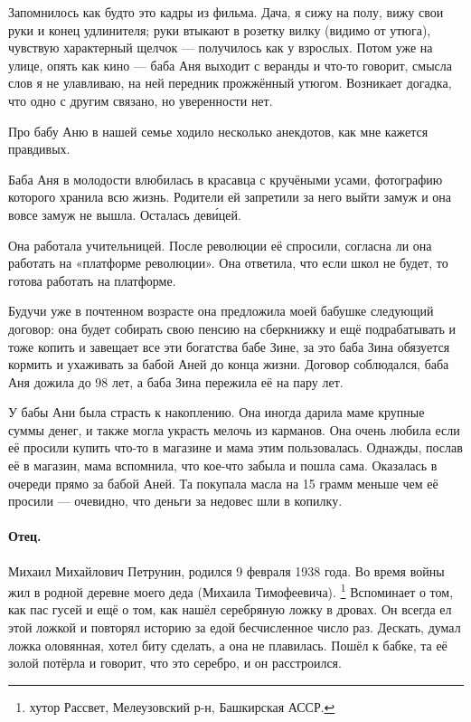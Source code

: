 \documentclass{book}
\begin{document}
Запомнилось как будто это кадры из фильма.
Дача, я сижу на полу, вижу свои руки и конец удлинителя;
руки втыкают в розетку вилку (видимо от утюга), чувствую характерный щелчок --- получилось как у взрослых.
Потом уже на улице, опять как кино --- баба Аня выходит с веранды и что-то говорит, смысла слов я не улавливаю, на ней передник прожжённый утюгом.
Возникает догадка, что одно с другим связано, но уверенности нет.

Про бабу Аню в нашей семье ходило несколько анекдотов, как мне кажется правдивых.

Баба Аня в молодости влюбилась в красавца с кручёными усами, фотографию которого хранила всю жизнь.
Родители ей запретили за него выйти замуж и она вовсе замуж не вышла.
Осталась дев\'{и}цей.

Она работала учительницей.
После революции её спросили, согласна ли она работать на «платформе революции».
Она ответила, что если школ не будет, то готова работать на платформе.

Будучи уже в почтенном возрасте она предложила моей бабушке следующий договор: она будет собирать свою пенсию на сберкнижку и ещё подрабатывать и тоже копить и завещает все эти богатства бабе Зине, за это баба Зина обязуется кормить и ухаживать за бабой Аней до конца жизни.
Договор соблюдался, баба Аня дожила до 98 лет, а баба Зина пережила её на пару лет.

У бабы Ани была страсть к накоплению.
Она иногда дарила маме крупные суммы денег, и также могла украсть мелочь из карманов.
Она очень любила если её просили купить что-то в магазине и мама этим пользовалась.
Однажды, послав её в магазин, мама вспомнила, что кое-что забыла и пошла сама.
Оказалась в очереди прямо за бабой Аней.
Та покупала масла на 15 грамм меньше чем её просили — очевидно, что деньги за недовес шли в копилку.

\paragraph{Отец.}  Михаил Михайлович Петрунин, родился 9 февраля 1938 года.
Во время войны жил в родной деревне моего деда (Михаила Тимофеевича).%
\footnote{хутор Рассвет, Мелеузовский р-н, Башкирская АССР.}
Вспоминает о том, как пас гусей и ещё о том, как нашёл серебряную ложку в дровах.
Он всегда ел этой ложкой и повторял историю за едой бесчисленное число раз.
Дескать, думал ложка оловянная, хотел биту сделать, а она не плавилась.
Пошёл к бабке, та её золой потёрла и говорит, что это серебро, и он расстроился.
\end{document}
